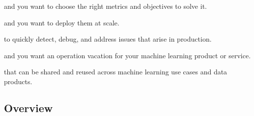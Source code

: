\begin{frame}{}
  \begin{statement}
    and you want to choose the right \alert{metrics and objectives} to solve it.
  \end{statement}
\end{frame}

\begin{frame}{}
  \begin{statement}
    and you
    want to \alert{deploy} them at scale.
    \end{statement}
\end{frame}

\begin{frame}{}
  \begin{statement}
    to quickly detect, debug, 
and \alert{address issues} that arise in production.
  \end{statement}
\end{frame}

\begin{frame}{}
  \begin{statement}
    and you want an \alert{operation vacation} for your machine learning product or service.
  \end{statement}
\end{frame}

\begin{frame}{}
  \begin{statement}
    that can be
    \alert{shared and reused} across machine learning use cases and data products.  
  \end{statement}
\end{frame}




\subsection{Overview}

